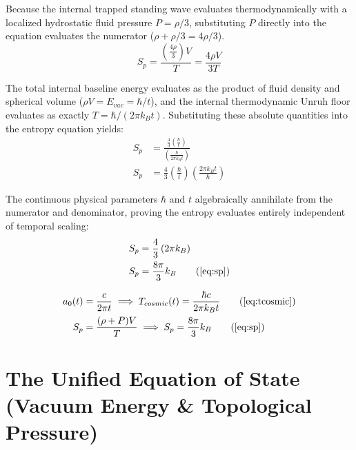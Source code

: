 \documentclass[11pt, a4paper]{article}
\begin{document}
Because the internal trapped standing wave evaluates thermodynamically with a localized hydrostatic fluid pressure $P = \rho/3$, substituting $P$ directly into the equation evaluates the numerator ($\rho + \rho/3 = 4\rho/3$). 
\begin{equation}
    S_p = \frac{\left(\frac{4\rho}{3}\right)V}{T} = \frac{4 \rho V}{3 T} 
\end{equation}

The total internal baseline energy evaluates as the product of fluid density and spherical volume ($\rho V = E_{vac} = \hbar/t$), and the internal thermodynamic Unruh floor evaluates as exactly $T = \hbar / (2\pi k_B t)$. Substituting these absolute quantities into the entropy equation yields:
\begin{align}
    S_p &= \frac{\frac{4}{3} \left(\frac{\hbar}{t}\right)}{\left(\frac{\hbar}{2\pi k_B t}\right)}  \\
    S_p &= \frac{4}{3} \left( \frac{\hbar}{t} \right) \left( \frac{2\pi k_B t}{\hbar} \right) 
\end{align}

The continuous physical parameters $\hbar$ and $t$ algebraically annihilate from the numerator and denominator, proving the entropy evaluates entirely independent of temporal scaling:
\begin{align}
    S_p &= \frac{4}{3} \left( 2\pi k_B \right)  \\
    S_p &= \frac{8\pi}{3} k_B \tag{\ref{eq:sp}}
\end{align}

\begin{tcolorbox}[recallbox, title={\ref{box:thermo_vacuum}. Absolute Thermodynamic Vacuum \& Entropy}]
\begin{align}
    a_0(t) &= \frac{c}{2\pi t} \implies T_{cosmic}(t) = \frac{\hbar c}{2\pi k_B t} \tag{\ref{eq:tcosmic}} \\
    S_p &= \frac{(\rho + P)V}{T} \implies S_p = \frac{8\pi}{3} k_B \tag{\ref{eq:sp}}
\end{align}
\end{tcolorbox}







\section{The Unified Equation of State (Vacuum Energy \& Topological Pressure)}
\label{sec:deriv_unified_eos}
\end{document}
